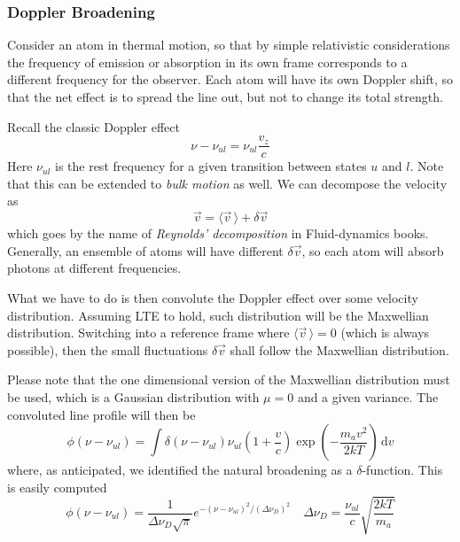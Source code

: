 \subsubsection{Doppler Broadening}

Consider an atom in thermal motion, so that by simple relativistic considerations the frequency of emission or absorption in its own frame corresponds to a different frequency for the observer. Each atom will have its own Doppler shift, so that the net effect is to spread the line out, but not to change its total strength.
\par Recall the classic Doppler effect 
\begin{equation}
    \nu -\nu_{ul} = \nu_{ul}\frac{v_{z}}{c}
\end{equation}
Here $\nu_{ul}$ is the rest frequency for a given transition between states $u$ and $l$. Note that this can be extended to \emph{bulk motion} as well. We can decompose the velocity as
\begin{equation*}
    \vec{v} = \langle\vec{v}\,\rangle + \delta\vec{v}
\end{equation*}
which goes by the name of \emph{Reynolds' decomposition} in Fluid-dynamics books. Generally, an ensemble of atoms will have different $\delta\vec{v}$, so each atom will absorb photons at different frequencies.
\par What we have to do is then convolute the Doppler effect over some velocity distribution. Assuming LTE to hold, such distribution will be the Maxwellian distribution. Switching into a reference frame where $\langle\vec{v}\,\rangle = 0$ (which is always possible), then the small fluctuations $\delta\vec{v}$ shall follow the Maxwellian distribution.
\par Please note that the one dimensional version of the Maxwellian distribution must be used, which is a Gaussian distribution with $\mu = 0$ and a given variance. The convoluted line profile will then be 
\begin{equation*}
    \phi(\nu-\nu_{ul}) = \int \delta(\nu-\nu_{ul})\nu_{ul}\left(1+\frac{v}{c}\right)\exp\left(-\frac{m_{a}v^{2}}{2kT}\right)\,\text{d}v
\end{equation*}
where, as anticipated, we identified the natural broadening as a $\delta$-function. This is easily computed
\begin{equation}
    \phi(\nu-\nu_{ul}) = \frac{1}{\Delta\nu_{D}\sqrt{\pi}}e^{-(\nu-\nu_{ul})^{2}/(\Delta \nu_{D})^{2}} \quad \Delta\nu_{D} = \frac{\nu_{ul}}{c}\sqrt{\frac{2kT}{m_{a}}}
\end{equation}
